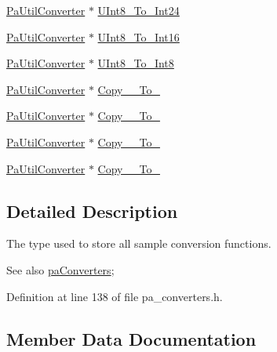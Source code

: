 \begin{DoxyCompactItemize}
\item 
\hyperlink{pa__converters_8h_a4f65f7c2e9e185e7f8caebe85ae9575c}{Pa\+Util\+Converter} $\ast$ \hyperlink{struct_pa_util_converter_table_a4ef3d4ced585f42bf87eaaf249eec785}{U\+Int8\+\_\+\+To\+\_\+\+Int24}
\item 
\hyperlink{pa__converters_8h_a4f65f7c2e9e185e7f8caebe85ae9575c}{Pa\+Util\+Converter} $\ast$ \hyperlink{struct_pa_util_converter_table_a528a5c5de94630da91f487edddab8d26}{U\+Int8\+\_\+\+To\+\_\+\+Int16}
\item 
\hyperlink{pa__converters_8h_a4f65f7c2e9e185e7f8caebe85ae9575c}{Pa\+Util\+Converter} $\ast$ \hyperlink{struct_pa_util_converter_table_a26de7b4f39c4039149712252d7fec098}{U\+Int8\+\_\+\+To\+\_\+\+Int8}
\item 
\hyperlink{pa__converters_8h_a4f65f7c2e9e185e7f8caebe85ae9575c}{Pa\+Util\+Converter} $\ast$ \hyperlink{struct_pa_util_converter_table_aad050de93061e769c88bc81c07207c23}{Copy\+\_\+\_\+\+To\+\_}
\item 
\hyperlink{pa__converters_8h_a4f65f7c2e9e185e7f8caebe85ae9575c}{Pa\+Util\+Converter} $\ast$ \hyperlink{struct_pa_util_converter_table_ac4705d4b95c245196c5653dbccfcbbb9}{Copy\+\_\+\_\+\+To\+\_}
\item 
\hyperlink{pa__converters_8h_a4f65f7c2e9e185e7f8caebe85ae9575c}{Pa\+Util\+Converter} $\ast$ \hyperlink{struct_pa_util_converter_table_a54a78a163a0a0371951fd202199c6436}{Copy\+\_\+\_\+\+To\+\_}
\item 
\hyperlink{pa__converters_8h_a4f65f7c2e9e185e7f8caebe85ae9575c}{Pa\+Util\+Converter} $\ast$ \hyperlink{struct_pa_util_converter_table_a84473be550e04bb6802d5e6338c814de}{Copy\+\_\+\_\+\+To\+\_}
\end{DoxyCompactItemize}


\subsection{Detailed Description}
The type used to store all sample conversion functions. \begin{DoxySeeAlso}{See also}
\hyperlink{pa__converters_8h_ad600a701983981d00371cb22ed6fb648}{pa\+Converters}; 
\end{DoxySeeAlso}


Definition at line 138 of file pa\+\_\+converters.\+h.



\subsection{Member Data Documentation}
